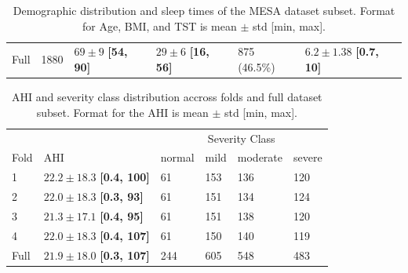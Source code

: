 \begin{table}
\begin{tabular}{p{1cm} p{1cm} p{1.7cm} p{1.7cm} p{1.7cm} p{1.7cm}}
        \hline
        Full & 1880 & $69\pm9$ \newline \textbf{[54, 90]} & $29\pm6$ \newline \textbf{[16, 56]} & 875 \newline (46.5\%) & $6.2\pm1.38$ \newline \textbf{[0.7, 10]} \\
    \end{tabular}
    \caption{Demographic distribution and sleep times of the MESA dataset subset. Format for Age, BMI, and TST is mean $\pm$ std [min, max]. \label{tab:dataset-demographics}}
\end{table}

\renewcommand{\arraystretch}{1.5}
\begin{table}
    \centering
    \begin{tabular}{p{1cm} p{2cm} p{1.5cm} p{1.5cm} p{1.5cm} p{1.5cm}}
         &  & \multicolumn{4}{c}{Severity Class} \\
        \cline{3-6}
        Fold & AHI & normal & mild & moderate & severe \\
        \hline
        1 & $22.2\pm18.3$ \newline \textbf{[0.4, 100]} & 61 & 153 & 136 & 120 \\
        2 & $22.0\pm18.3$ \newline \textbf{[0.3, 93]} & 61 & 151 & 134 & 124 \\
        3 & $21.3\pm17.1$ \newline \textbf{[0.4, 95]} & 61 & 151 & 138 & 120 \\
        4 & $22.0\pm18.3$ \newline \textbf{[0.4, 107]} & 61 & 150 & 140 & 119 \\
        \hline
        Full & $21.9\pm18.0$ \newline \textbf{[0.3, 107]} & 244 & 605 & 548 & 483 \\
    \end{tabular}
    \caption{AHI and severity class distribution accross folds and full dataset subset. Format for the AHI is mean $\pm$ std [min, max]. \label{tab:dataset-ahi}}
\end{table}


